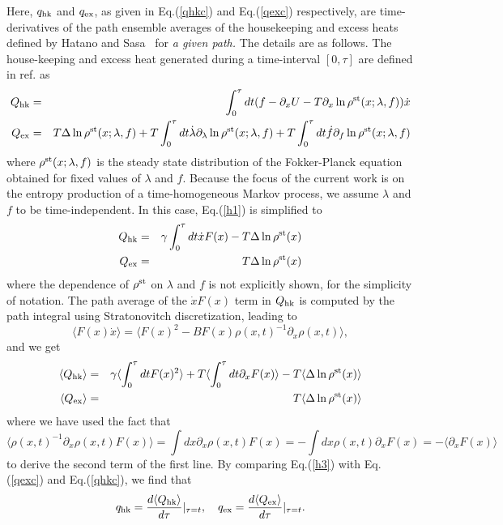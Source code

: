 \documentclass[aps,pre,amsmath,amssymb,floatfix,preprint,nofootinbib]{revtex4}
\begin{document}
Here, $q_{\rm hk}$ and $q_{\rm ex}$, as given in Eq.(\ref{qhkc}) and Eq.(\ref{qexc}) respectively, are time-derivatives of the path ensemble averages of the housekeeping and excess heats defined by Hatano and Sasa~\cite{hs} for {\it a given path.} The details are as follows.  
The house-keeping and excess heat generated during a time-interval $[0,\tau]$ are defined in ref.\cite{hs} as
\begin{eqnarray}
Q_{\rm hk} &=& \int_0^\tau dt (f - \partial_x U - T \partial_x \ln \rho^{\rm st} (x; \lambda,f) ) \dot x \nonumber\\
Q_{\rm ex} &=&T \Delta \ln \rho^{\rm st} (x; \lambda,f) +  T \int_0^\tau dt \dot \lambda \partial_\lambda \ln \rho^{\rm st} (x; \lambda,f) + T \int_0^\tau dt \dot f \partial_f \ln \rho^{\rm st} (x; \lambda,f) \label{h1} 
\end{eqnarray}
where $\rho^{\rm st} (x; \lambda,f)$ is the steady state distribution of the Fokker-Planck equation obtained for fixed values of  $\lambda$ and $f$.  Because the focus of the current work is on the entropy production of a time-homogeneous Markov process, we assume $\lambda$ and $f$ to be time-independent. In this case, Eq.(\ref{h1}) is simplified to
\begin{eqnarray}
Q_{\rm hk} &=& \gamma \int_0^\tau dt \dot x F(x) - T \Delta \ln \rho^{\rm st} (x)  \nonumber\\
Q_{\rm ex} &=&T \Delta \ln \rho^{\rm st} (x) \label{h2} 
\end{eqnarray} 
where the dependence of $\rho^{\rm st}$ on $\lambda$ and $f$ is not explicitly shown, for the simplicity of notation. The path average of the $\dot x F(x)$ term in $Q_{\rm hk}$ is computed by the path integral using Stratonovitch discretization, leading to~\cite{seif1,seif2}
\begin{equation}
\langle F(x)\dot x \rangle = \langle F(x)^2  - B  F(x) {\rho(x,t)}^{-1} \partial_x \rho(x,t) \rangle,\label{strat}
\end{equation}
and we get
 \begin{eqnarray}
\langle Q_{\rm hk} \rangle &=& \gamma \langle \int_0^\tau dt  F(x)^2 \rangle +T  \langle \int_0^\tau dt  \partial_x F(x) \rangle - T \langle \Delta \ln \rho^{\rm st} (x) \rangle \nonumber\\
\langle Q_{\rm ex} \rangle &=&T \langle \Delta \ln \rho^{\rm st} (x) \rangle \label{h3} 
\end{eqnarray}  
where we have used the fact that
\begin{equation}
\langle   {\rho(x,t)}^{-1}{\partial_x \rho(x,t)} F(x) \rangle = \int dx \partial_x \rho(x,t) F(x) = -\int dx  \rho(x,t) \partial_x F(x) = -\langle  \partial_x F(x) \rangle
\end{equation}
 to derive the second term of the first line. By comparing Eq.(\ref{h3}) with Eq.(\ref{qexc}) and Eq.(\ref{qhkc}), we find that
 \begin{equation}
 q_{\rm hk} = \frac{d \langle Q_{\rm hk} \rangle}{d \tau} |_{\tau = t}, \quad q_{\rm ex} = \frac{d \langle Q_{\rm ex} \rangle}{d \tau} |_{\tau = t}. 
 \end{equation}
\end{document}
